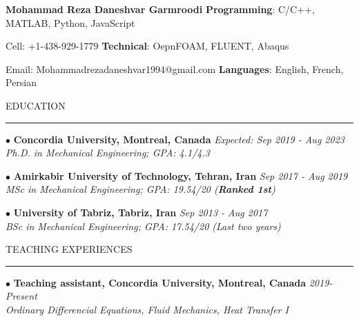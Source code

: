 \documentclass[10.5pt]{article}
\newcommand\tab[1][0.5cm]{\hspace*{#1}}
\begin{document}
	
	\noindent \textbf{Mohammad Reza Daneshvar Garmroodi} \tab \tab \tab \tab  \textbf{Programming}: C/C++, MATLAB, Python, JavaScript
	
	\noindent Cell: +1-438-929-1779 \tab \tab \tab \tab \tab \tab \tab \tab \tab \tab \tab \tab \textbf{Technical}: OepnFOAM, FLUENT, Abaqus
	
	\noindent Email: Mohammadrezadaneshvar1994@gmail.com \tab \tab \tab 
	\textbf{Languages}: English, French, Persian
	
	
	\vspace{3mm}
	
	
	\noindent EDUCATION
	
	\vspace{-2mm}
	
	\noindent\rule[0.5ex]{\linewidth}{1pt}
	
	
		{\noindent $\bullet$ \bf Concordia University, Montreal, Canada} \hfill {\em Expected: Sep 2019 - Aug 2023} 
		\\ \textit{Ph.D. in Mechanical Engineering; GPA: 4.1/4.3}
		
		\vspace{1.5mm}
		
		{\noindent $\bullet$ \bf Amirkabir University of Technology, Tehran, Iran} \hfill {\em Sep 2017 - Aug 2019} 
		\\ \textit{MSc in Mechanical Engineering; GPA: 19.54/20 (\textbf{Ranked 1st})}
	
		\vspace{1.5mm}
		
		{\noindent $\bullet$ \bf University of Tabriz, Tabriz, Iran} \hfill {\em Sep 2013 - Aug 2017} 
		\\ \textit{BSc in Mechanical Engineering; GPA: 17.54/20 (Last two years)}
		
		
			\vspace{2mm}
		
		\noindent TEACHING EXPERIENCES
		
		\vspace{-2mm}
		
		\noindent\rule[0.5ex]{\linewidth}{1pt}
		
		{\noindent $\bullet$ \bf Teaching assistant, Concordia University, Montreal, Canada} \hfill {\em 2019-Present} 
		\\ \textit{Ordinary Differencial Equations, Fluid Mechanics, Heat Transfer I}
		
		\vspace{1.5mm}
		
\end{document}

